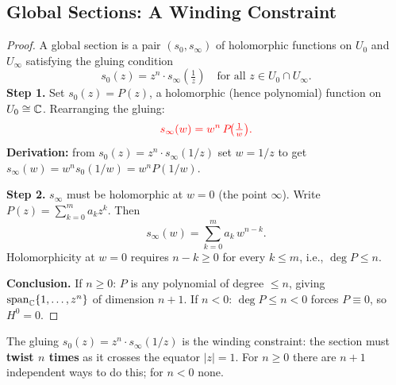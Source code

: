 \documentclass[11pt,openany]{article}
\renewcommand{\emph}[1]{\textbf{#1}}
\newenvironment{infobox}{%
  \def\FrameCommand{\fboxrule=0.8pt \fboxsep=8pt \colorbox{noteblue}}%
  \MakeFramed{\advance\hsize-\width \FrameRestore}}{\endMakeFramed}
\newcommand{\CP}{\mathbb{CP}}
\newcommand{\CPone}{\CP^1}
\begin{document}
\subsection{Global Sections: A Winding Constraint}
\label{subsec:sections}

\probox{%
\begin{proposition}
\label{prop:sections}
For $n\geq 0$,
\[
  H^0\!\bigl(\CPone,\,\mathcal{O}(n)\bigr)
  = \operatorname{span}_\C\{1,\,z,\,z^2,\,\ldots,\,z^n\},
  \qquad
  h^0\!\bigl(\mathcal{O}(n)\bigr) = n+1.
\]
For $n<0$, $H^0\!\bigl(\CPone,\,\mathcal{O}(n)\bigr)=0$.
\end{proposition}}

\begin{proof}
A global section is a pair $(s_0,s_\infty)$ of holomorphic functions on $U_0$ and
$U_\infty$ satisfying the gluing condition
\[
  s_0(z) = z^n\cdot s_\infty\!\left(\tfrac{1}{z}\right)
  \quad\text{for all }z\in U_0\cap U_\infty.
\]
\textbf{Step 1.}
{\color{orange}Set $s_0(z)=P(z)$, a holomorphic (hence polynomial) function on $U_0\cong\mathbb{C}$.}
Rearranging the gluing:
\[
  {\color{red}s_\infty(w) = w^n\,P\!\bigl({\textstyle\frac{1}{w}}\bigr).}
\]
\emph{Derivation:} from $s_0(z)=z^n\cdot s_\infty(1/z)$ set $w=1/z$ to get
$s_\infty(w)=w^n s_0(1/w)=w^n P(1/w)$.

\textbf{Step 2.}
$s_\infty$ must be holomorphic at $w=0$ (the point $\infty$).
Write $P(z)=\sum_{k=0}^m a_k z^k$.  Then
\[
  s_\infty(w)=\sum_{k=0}^m a_k\,w^{n-k}.
\]
Holomorphicity at $w=0$ requires $n-k\geq 0$ for every $k\leq m$, i.e., $\deg P\leq n$.

\textbf{Conclusion.}
If $n\geq 0$: $P$ is any polynomial of degree $\leq n$, giving $\operatorname{span}_{\mathbb{C}}\{1,\ldots,z^n\}$
of dimension $n+1$.
If $n<0$: $\deg P\leq n<0$ forces $P\equiv 0$, so $H^0=0$.
\end{proof}

\begin{infobox}
The gluing $s_0(z)=z^n\cdot s_\infty(1/z)$ is the winding constraint: the section must
\emph{twist $n$ times} as it crosses the equator $|z|=1$.
For $n\geq 0$ there are $n+1$ independent ways to do this; for $n<0$ none.
\end{infobox}

\medskip
\begin{center}

\end{center}

\newpage
\end{document}
